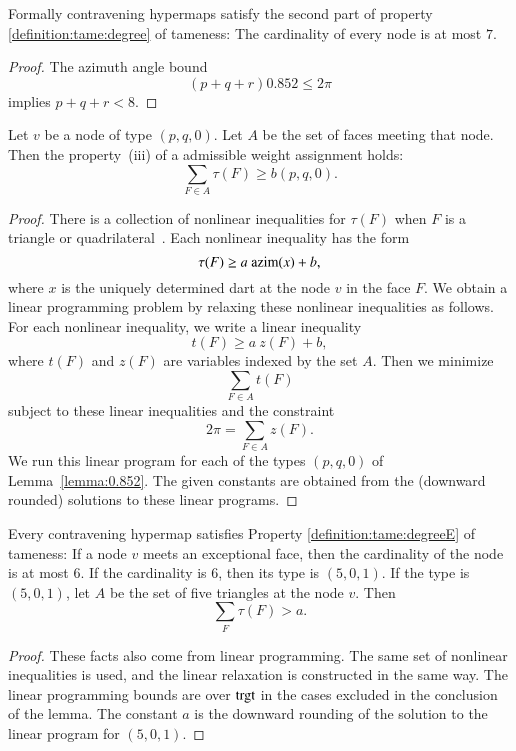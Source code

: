 \begin{lemma} 
Formally contravening hypermaps satisfy the second part of property
\ref{definition:tame:degree} of tameness: The cardinality of every
node is at most $7$.
\end{lemma}

\begin{proof}  The azimuth angle bound
$$
 (p+q+r) 0.852 \le 2\pi
$$
implies $p+q+r < 8$.
\end{proof}




\begin{lemma} 
Let $v$ be a node of type $(p,q,0)$.  Let $A$ be the set of faces meeting that node.  Then the property~(iii) of a admissible weight assignment holds:
$$
\sum_{F\in A} \tau(F) \ge  b(p,q,0).
$$
\end{lemma}

\begin{proof} There is a collection of nonlinear inequalities
for $\tau(F)$ when $F$ is a triangle or quadrilateral~\cite[FUSDSPJ]{hales:2009:nonlinear}. Each nonlinear inequality has the form
$$\tau(F) \ge a~{\operatorname{azim}}(x) + b,$$
where $x$ is the uniquely determined dart at the node $v$ in the face $F$. We obtain a linear programming problem by relaxing these nonlinear inequalities as follows.  For each nonlinear inequality, we write a linear inequality
$$
t(F) \ge a~z(F) + b,
$$
where $t(F)$ and $z(F)$ are variables indexed by the set $A$.
Then we minimize 
$$\sum_{F\in A} t(F)$$
subject to these linear inequalities and the constraint
$$
2\pi = \sum_{F\in A} z(F).
$$
We run this linear program for each of the types $(p,q,0)$ of Lemma~\ref{lemma:0.852}. The given constants are obtained from the (downward rounded) solutions to these linear programs.
\end{proof}

\begin{lemma}\label{lemma:deg5}
Every contravening hypermap satisfies Property
\ref{definition:tame:degreeE} of tameness: If a node $v$ meets an
exceptional face, then the cardinality of the node is at most $6$.
If the cardinality is $6$, then its type is $(5,0,1)$.
If the type is $(5,0,1)$, let $A$ be the set of five triangles at the
node $v$.  Then
$$
\sum_F \tau(F) > a.
$$
\end{lemma}

\begin{proof} These facts also come from linear programming.
The same set of nonlinear inequalities is used, and the linear
relaxation is constructed in the same way.  The linear programming
bounds are over ${\operatorname{trgt}}$ in the cases excluded in the conclusion
of the lemma.  The constant $a$ is the downward rounding of the solution to the linear program for $(5,0,1)$.
\end{proof}

